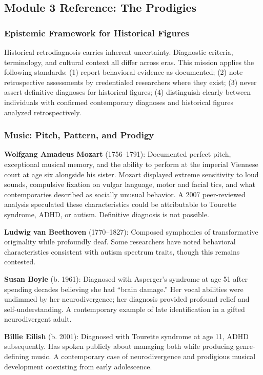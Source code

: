 \documentclass[11pt,letterpaper]{article}
\begin{document}
\subsection{Module 3 Reference: The Prodigies}

\subsubsection{Epistemic Framework for Historical Figures}

Historical retrodiagnosis carries inherent uncertainty. Diagnostic criteria, terminology, and cultural context all differ across eras. This mission applies the following standards: (1) report behavioral evidence as documented; (2) note retrospective assessments by credentialed researchers where they exist; (3) never assert definitive diagnoses for historical figures; (4) distinguish clearly between individuals with confirmed contemporary diagnoses and historical figures analyzed retrospectively.

\subsubsection{Music: Pitch, Pattern, and Prodigy}

\textbf{Wolfgang Amadeus Mozart} (1756--1791): Documented perfect pitch, exceptional musical memory, and the ability to perform at the imperial Viennese court at age six alongside his sister. Mozart displayed extreme sensitivity to loud sounds, compulsive fixation on vulgar language, motor and facial tics, and what contemporaries described as socially unusual behavior. A 2007 peer-reviewed analysis speculated these characteristics could be attributable to Tourette syndrome, ADHD, or autism. Definitive diagnosis is not possible.

\textbf{Ludwig van Beethoven} (1770--1827): Composed symphonies of transformative originality while profoundly deaf. Some researchers have noted behavioral characteristics consistent with autism spectrum traits, though this remains contested.

\textbf{Susan Boyle} (b. 1961): Diagnosed with Asperger's syndrome at age 51 after spending decades believing she had ``brain damage.'' Her vocal abilities were undimmed by her neurodivergence; her diagnosis provided profound relief and self-understanding. A contemporary example of late identification in a gifted neurodivergent adult.

\textbf{Billie Eilish} (b. 2001): Diagnosed with Tourette syndrome at age 11, ADHD subsequently. Has spoken publicly about managing both while producing genre-defining music. A contemporary case of neurodivergence and prodigious musical development coexisting from early adolescence.
\end{document}
